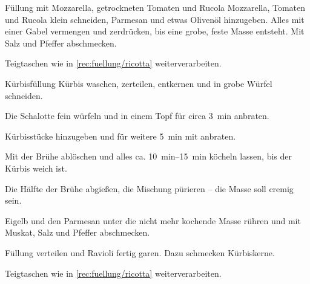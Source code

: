 \begin{recipe}{Füllung mit Mozzarella, getrockneten Tomaten und Rucola}{}{}
    Mozzarella, Tomaten und Rucola klein schneiden, Parmesan und etwas Olivenöl hinzugeben. Alles mit einer Gabel vermengen und zerdrücken, bis eine grobe, feste Masse entsteht. Mit Salz und Pfeffer abschmecken.

    \newstep
    Teigtaschen wie in \cref{rec:fuellung/ricotta} weiterverarbeiten.
    \freeform\hrulefill
\end{recipe}

\begin{recipe}{Kürbisfüllung}{}{}
    Kürbis waschen, zerteilen, entkernen und in grobe Würfel schneiden.

    Die Schalotte fein würfeln und in einem Topf für circa \SI{3}{\minute} anbraten.

    Kürbisstücke hinzugeben und für weitere \SI{5}{\minute} mit anbraten.

    Mit der Brühe ablöschen und alles ca. \SIrange{10}{15}{\minute} köcheln lassen, bis der Kürbis weich ist.

    Die Hälfte der Brühe abgießen, die Mischung pürieren – die Masse soll cremig sein.

    Eigelb und  den Parmesan unter die nicht mehr kochende Masse rühren und mit Muskat, Salz und Pfeffer abschmecken.

    Füllung verteilen und Ravioli fertig garen. Dazu schmecken Kürbiskerne.

    \newstep
    Teigtaschen wie in \cref{rec:fuellung/ricotta} weiterverarbeiten.
    \freeform\hrulefill
\end{recipe}
